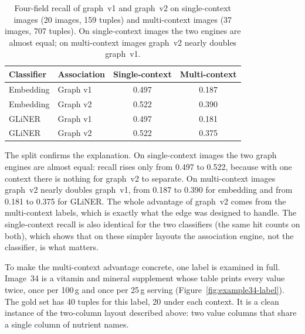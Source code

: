 \begin{table}[htbp]
  \centering
  \caption[Graph v1 versus graph v2: single- and multi-context recall]{%
    Four-field recall of graph~v1 and graph~v2 on single-context images (20
    images, 159 tuples) and multi-context images (37 images, 707 tuples).
    On single-context images the two engines are almost equal; on
    multi-context images graph~v2 nearly doubles graph~v1.}
  \label{tab:graph-context}
  \small
  \begin{tabular}{@{}llcc@{}}
    \toprule
    \textbf{Classifier} & \textbf{Association} & \textbf{Single-context} & \textbf{Multi-context} \\
    \midrule
    Embedding & Graph v1 & 0.497 & 0.187 \\
    Embedding & Graph v2 & 0.522 & 0.390 \\
    \addlinespace
    GLiNER    & Graph v1 & 0.497 & 0.181 \\
    GLiNER    & Graph v2 & 0.522 & 0.375 \\
    \bottomrule
  \end{tabular}
\end{table}

The split confirms the explanation. On single-context images the two graph
engines are almost equal: recall rises only from 0.497 to 0.522, because
with one context there is nothing for graph~v2 to separate. On
multi-context images graph~v2 nearly doubles graph~v1, from 0.187 to 0.390
for embedding and from 0.181 to 0.375 for GLiNER. The whole advantage of
graph~v2 comes from the multi-context labels, which is exactly what the
 edge was designed to handle. The single-context recall
is also identical for the two classifiers (the same hit counts on both),
which shows that on these simpler layouts the association engine, not the
classifier, is what matters.


To make the multi-context advantage concrete, one label is examined in full.
Image~34 is a vitamin and mineral supplement whose table prints every value
twice, once per 100\,g and once per 25\,g serving
(Figure~\ref{fig:example34-label}). The gold set has 40 tuples for this label,
20 under each context. It is a clean instance of the two-column layout described
above: two value columns that share a single column of nutrient names.

